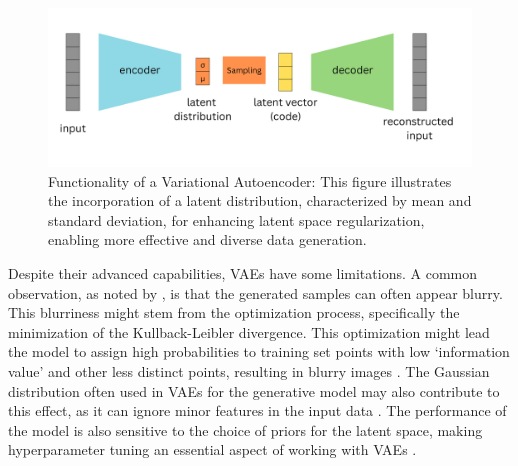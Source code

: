 \begin{figure}[ht]
    \centering
      \hspace{.8cm}
      \includegraphics[width=.9\columnwidth]{figures/VAE.png}
      \caption{Functionality of a Variational Autoencoder: This figure illustrates the incorporation of a latent distribution, characterized by mean and standard deviation, for enhancing latent space regularization, enabling more effective and diverse data generation.}\label{fig:figureVAE}
\end{figure}

Despite their advanced capabilities, VAEs have some limitations. A common observation, as noted by \citeauthor{GoodfellowDeepLearning}, is that the generated samples can often appear blurry. This blurriness might stem from the optimization process, specifically the minimization of the Kullback-Leibler divergence. This optimization might lead the model to assign high probabilities to training set points with low `information value' and other less distinct points, resulting in blurry images \citep{GoodfellowDeepLearning}. The Gaussian distribution often used in VAEs for the generative model may also contribute to this effect, as it can ignore minor features in the input data \citep{GoodfellowDeepLearning}. The performance of the model is also sensitive to the choice of priors for the latent space, making hyperparameter tuning an essential aspect of working with VAEs \citep{kingmaVAE, higginsVAE}.
